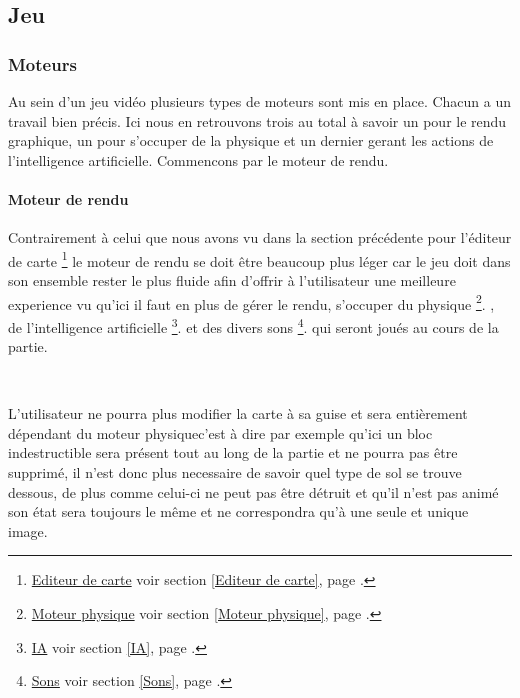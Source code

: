 \subsection{Jeu}

	\subsubsection{Moteurs}
	
		Au sein d'un jeu vidéo plusieurs types de moteurs sont mis en place.
		Chacun a un travail bien précis.
		Ici nous en retrouvons trois au total à savoir un pour le rendu graphique, un
		pour s'occuper de la physique et un dernier gerant les actions de
		l'intelligence artificielle.
		Commencons par le moteur de rendu.
	
		\paragraph{Moteur de rendu\\}
		
			\hypertarget{Moteur de rendu}{}
			\label{Moteur de rendu}
		
			Contrairement à celui que nous avons vu dans la section précédente pour
			l'éditeur de carte
			\footnote{
				\hyperlink{Editeur de carte}{Editeur de carte}
				\og voir section \ref{Editeur de carte}, page \pageref{Editeur de carte}.\fg
			}
			le moteur de rendu se doit être beaucoup plus léger car le jeu doit dans son
			ensemble rester le plus fluide afin d'offrir à l'utilisateur une meilleure
			experience vu qu'ici il faut en plus de gérer le rendu, s'occuper du
			physique
			\footnote{
				\hyperlink{Moteur physique}{Moteur physique}
				\og voir section \ref{Moteur physique}, page \pageref{Moteur physique}.\fg
			}.
			, de l'intelligence artificielle
			\footnote{
				\hyperlink{IA}{IA}
				\og voir section \ref{IA}, page \pageref{IA}.\fg
			}.
			et des divers sons
			\footnote{
				\hyperlink{Sons}{Sons}
				\og voir section \ref{Sons}, page \pageref{Sons}.\fg
			}.
			qui seront joués au cours de la partie.		
			
			$\,$	
			
			L'utilisateur ne pourra plus modifier la carte à sa guise et sera
			entièrement dépendant du moteur physique\footnotemark[3] c'est à dire par
			exemple qu'ici un bloc indestructible sera présent tout au long de la
			partie et ne pourra pas être supprimé, il n'est donc plus necessaire de
			savoir quel type de sol se trouve dessous, de plus comme celui-ci ne peut pas
			être détruit et qu'il n'est pas animé son état sera toujours le même et ne
			correspondra qu'à une seule et unique image.
			
